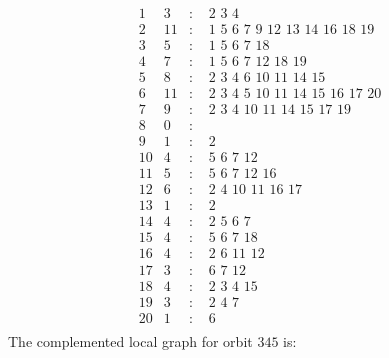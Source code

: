 \documentclass[12pt]{article}
\begin{document}
\begin{equation*}
\begin{array}{rrcl}
1&3&:&\,\,2\,\,3\,\,4\\
2&11&:&\,\,1\,\,5\,\,6\,\,7\,\,9\,\,12\,\,13\,\,14\,\,16\,\,18\,\,19\\
3&5&:&\,\,1\,\,5\,\,6\,\,7\,\,18\\
4&7&:&\,\,1\,\,5\,\,6\,\,7\,\,12\,\,18\,\,19\\
5&8&:&\,\,2\,\,3\,\,4\,\,6\,\,10\,\,11\,\,14\,\,15\\
6&11&:&\,\,2\,\,3\,\,4\,\,5\,\,10\,\,11\,\,14\,\,15\,\,16\,\,17\,\,20\\
7&9&:&\,\,2\,\,3\,\,4\,\,10\,\,11\,\,14\,\,15\,\,17\,\,19\\
8&0&:&\\
9&1&:&\,\,2\\
10&4&:&\,\,5\,\,6\,\,7\,\,12\\
11&5&:&\,\,5\,\,6\,\,7\,\,12\,\,16\\
12&6&:&\,\,2\,\,4\,\,10\,\,11\,\,16\,\,17\\
13&1&:&\,\,2\\
14&4&:&\,\,2\,\,5\,\,6\,\,7\\
15&4&:&\,\,5\,\,6\,\,7\,\,18\\
16&4&:&\,\,2\,\,6\,\,11\,\,12\\
17&3&:&\,\,6\,\,7\,\,12\\
18&4&:&\,\,2\,\,3\,\,4\,\,15\\
19&3&:&\,\,2\,\,4\,\,7\\
20&1&:&\,\,6\\
\end{array}
\end{equation*}
The complemented local graph for orbit $345$ is:
\end{document}
